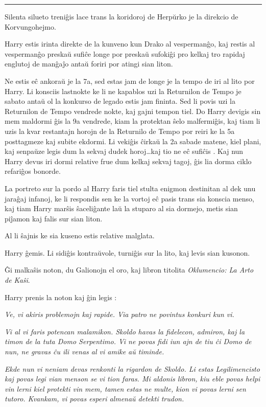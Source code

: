 \begin{center}\rule{3in}{0.4pt}\end{center}

Silenta silueto treniĝis lace trans la koridoroj de Herpŭrko je la
direkcio de Korvungohejmo.

Harry estis irinta direkte de la kunveno kun Drako al vespermanĝo, kaj
restis al vespermanĝo preskaŭ sufiĉe longe por preskaŭ sufokiĝi pro
kelkaj tro rapidaj englutoj de manĝaĵo antaŭ foriri por atingi sian
liton.

Ne estis eĉ ankoraŭ je la 7a, sed estas jam de longe je la tempo de
iri al lito por Harry. Li konsciis lastnokte ke li ne kapablos uzi la
Returnilon de Tempo je sabato antaŭ ol la konkurso de legado estis jam
fininta. Sed li povis uzi la Returnilon de Tempo vendrede nokte, kaj
gajni tempon tiel. Do Harry devigis sin mem maldormi ĝis la 9a
vendrede, kiam la protektan ŝelo malfermiĝis, kaj tiam li uzis la kvar
restantajn horojn de la Returnilo de Tempo por reiri ke la 5a
posttagmeze kaj subite ekdormi. Li vekiĝis ĉirkaŭ la 2a sabade matene,
kiel plani, kaj senpaŭze legis dum la sekvaj dudek horoj\ldots kaj tio
ne eĉ sufiĉis . Kaj nun Harry devus iri dormi relative frue dum kelkaj
sekvaj tagoj, ĝis lia dorma ciklo refariĝos bonorde.

La portreto sur la pordo al Harry faris tiel stulta enigmon destinitan
al dek unu jaraĝaj infanoj, ke li respondis sen ke la vortoj eĉ pasis
trans sia konscia menso, kaj tiam Harry marŝis ŝaceliĝante laŭ la
stuparo al sia dormejo, metis sian piĵamon kaj falis sur sian liton.

Al li ŝajnis ke sia kuseno estis relative malglata.

Harry ĝemis. Li sidiĝis kontraŭvole, turniĝis sur la lito, kaj levis
sian kusonon.

Ĝi malkaŝis noton, du Galionojn el oro, kaj libron titolita
\emph{Oklumencio: La Arto de Kaŝi}.

Harry prenis la noton kaj ĝin legis :

\emph{Ve, vi akiris problemojn kaj rapide. Via patro ne povintus
konkuri kun vi.}

\emph {Vi al vi faris potencan malamikon. Skoldo havas la fidelecon,
admiron, kaj la timon de la tuta Domo Serpentimo. Vi ne povas fidi iun
ajn de tiu ĉi Domo de nun, ne gravas ĉu ili venas al vi amike aŭ
timinde.}

\emph{Ekde nun vi neniam devas renkonti la rigardon de Skoldo. Li
estas Legilimencisto kaj povas legi vian menson se vi tion faras. Mi
aldonis libron, kiu eble povas helpi vin lerni kiel protekti vin mem,
tamen estas ne multe, kion vi povas lerni sen tutoro. Kvankam, vi
povas esperi almenaŭ detekti trudon.}

